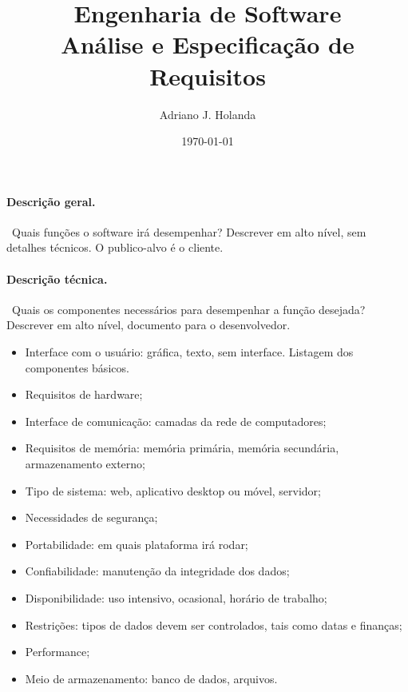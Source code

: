 \documentclass[a4paper]{article}
\begin{document}
\title{Engenharia de Software\\ Análise e Especificação de Requisitos}
\author{Adriano J. Holanda}
\date{\today}
\maketitle

\paragraph{Descrição geral.}~Quais funções o software irá desempenhar?
Descrever em alto nível, sem detalhes técnicos. O publico-alvo é o
cliente.

\paragraph{Descrição técnica.}~Quais os componentes necessários para
desempenhar a função desejada? Descrever em alto nível, documento para
o desenvolvedor.

\begin{itemize}
\item Interface com o usuário: gráfica, texto, sem interface. Listagem
  dos componentes básicos.
\item Requisitos de hardware;
\item Interface de comunicação: camadas da rede de computadores;
\item Requisitos de memória: memória primária, memória secundária,
  armazenamento externo;
\item Tipo de sistema: web, aplicativo desktop ou móvel, servidor;
\item Necessidades de segurança;
\item Portabilidade: em quais plataforma irá rodar;
\item Confiabilidade: manutenção da integridade dos dados;
\item Disponibilidade: uso intensivo, ocasional, horário de trabalho;
\item Restrições: tipos de dados devem ser controlados, tais como datas e finanças;
\item Performance;
\item Meio de armazenamento: banco de dados, arquivos.
\end{itemize}
\end{document}
